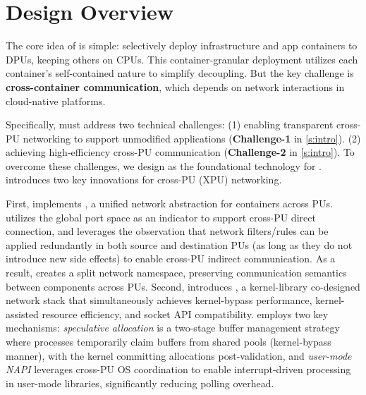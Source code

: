 \section{\xpod Design Overview}
\label{s:design-overview}


The core idea of \xpod is simple: selectively deploy infrastructure and app containers to DPUs, keeping others on CPUs. 
This container-granular deployment utilizes each container's self-contained nature to simplify decoupling. 
But the key challenge is \textbf{cross-container communication}, which depends on network interactions in cloud-native platforms.

Specifically, \xpod must address two technical challenges: 
(1) enabling transparent cross-PU networking to support unmodified applications (\textbf{Challenge-1} in \textsection\ref{s:intro}). (2) achieving high-efficiency cross-PU communication (\textbf{Challenge-2} in \textsection\ref{s:intro}).
To overcome these challenges, we design \os as the foundational technology for \xpod. \os introduces two key innovations for cross-PU (XPU) networking.


First, \os implements \giptable, a unified network abstraction for containers across PUs.
\giptable utilizes the global port space as an indicator to support cross-PU direct connection,
and leverages the observation that network filters/rules can be applied redundantly in both source and destination PUs (as long as they do not introduce new side effects) to enable cross-PU indirect communication.
As a result, \giptable creates a split network namespace, preserving communication semantics between components across PUs.
Second, \os introduces \gsocket, a kernel-library co-designed network stack that simultaneously achieves kernel-bypass performance, kernel-assisted resource efficiency, and socket API compatibility.
\gsocket employs two key mechanisms:
\emph{speculative allocation} is a two-stage buffer management strategy where processes temporarily claim buffers from shared pools (kernel-bypass manner), with the kernel committing allocations post-validation,
and \emph{user-mode NAPI} leverages cross-PU OS coordination to enable interrupt-driven processing in user-mode libraries, significantly reducing polling overhead.

